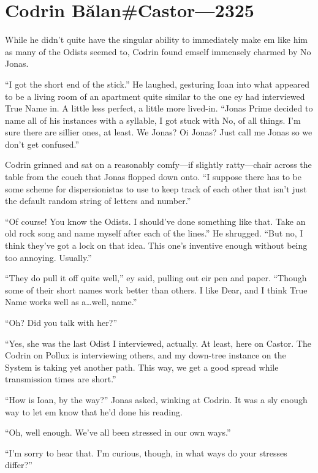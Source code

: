 \hypertarget{codrin-bux103lancastor-2325}{%
\chapter{Codrin Bălan\#Castor---2325}\label{codrin-bux103lancastor-2325}}

While he didn't quite have the singular ability to immediately make em like him as many of the Odists seemed to, Codrin found emself immensely charmed by No Jonas.

``I got the short end of the stick.'' He laughed, gesturing Ioan into what appeared to be a living room of an apartment quite similar to the one ey had interviewed True Name in. A little less perfect, a little more lived-in. ``Jonas Prime decided to name all of his instances with a syllable, I got stuck with No, of all things. I'm sure there are sillier ones, at least. We Jonas? Oi Jonas? Just call me Jonas so we don't get confused.''

Codrin grinned and sat on a reasonably comfy---if slightly ratty---chair across the table from the couch that Jonas flopped down onto. ``I suppose there has to be some scheme for dispersionistas to use to keep track of each other that isn't just the default random string of letters and number.''

``Of course! You know the Odists. I should've done something like that. Take an old rock song and name myself after each of the lines.'' He shrugged. ``But no, I think they've got a lock on that idea. This one's inventive enough without being too annoying. Usually.''

``They do pull it off quite well,'' ey said, pulling out eir pen and paper. ``Though some of their short names work better than others. I like Dear, and I think True Name works well as a\ldots well, name.''

``Oh? Did you talk with her?''

``Yes, she was the last Odist I interviewed, actually. At least, here on Castor. The Codrin on Pollux is interviewing others, and my down-tree instance on the System is taking yet another path. This way, we get a good spread while transmission times are short.''

``How is Ioan, by the way?'' Jonas asked, winking at Codrin. It was a sly enough way to let em know that he'd done his reading.

``Oh, well enough. We've all been stressed in our own ways.''

``I'm sorry to hear that. I'm curious, though, in what ways do your stresses differ?''

